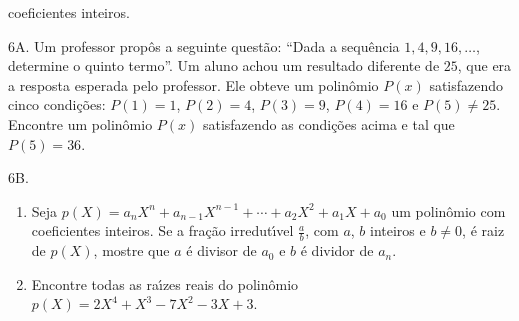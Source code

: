 \documentclass{prova}
\newcommand{\ds}{\displaystyle}
\begin{document}
\begin{questionario}
\begin{enumerate}
                    coeficientes inteiros.
            \end{enumerate}
        \item[6A.] Um professor prop\^os a seguinte quest\~ao: ``Dada a sequ\^encia
            $1,4,9,16,\ldots$, determine o quinto termo''. Um aluno achou um resultado
            diferente de $25$, que era a resposta esperada pelo professor. Ele obteve um
            polin\^omio $P(x)$ satisfazendo cinco condi\c{c}\~oes: $P(1)=1$, $P(2)=4$, $P(3)=9$,
            $P(4)=16$ e $P(5)\neq 25$. Encontre um polin\^omio $P(x)$ satisfazendo as
            condi\c{c}\~oes acima e tal que $P(5)=36$.
        \item[6B.]
            \begin{enumerate}
                \item Seja $p(X) = a_nX^n + a_{n-1}X^{n-1} + \cdots + a_2X^2 +
                    a_1X + a_0$ um polin\^omio com coeficientes inteiros. Se a fra\c{c}\~ao irredut\'{\i}vel
                    $\ds\frac{a}{b}$, com $a$, $b$ inteiros e $b\neq0$, \'e raiz de $p(X)$, mostre que $a$ \'e
                    divisor de $a_0$ e $b$ \'e dividor de $a_n$.
                \item Encontre todas as ra\'{\i}zes reais do polin\^omio $p(X) = 2X^4 + X^3 - 7X^2 - 3X + 3$.
            \end{enumerate}
	\end{questionario}
\end{document}
